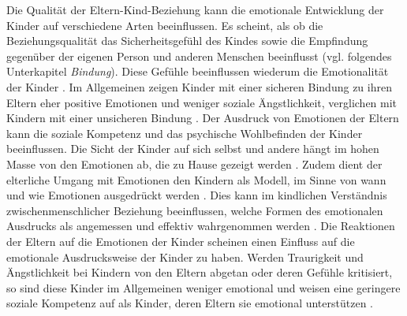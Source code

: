Die Qualität der Eltern-Kind-Beziehung kann die emotionale Entwicklung der Kinder auf verschiedene Arten beeinflussen. Es scheint, als ob die Beziehungsqualität das Sicherheitsgefühl des Kindes sowie die Empfindung gegenüber der eigenen Person und anderen Menschen beeinflusst (vgl. folgendes Unterkapitel \textit{Bindung}). Diese Gefühle beeinflussen wiederum die Emotionalität der Kinder \cite[S.~561]{Siegler2008}. Im Allgemeinen zeigen Kinder mit einer sicheren Bindung zu ihren Eltern eher positive Emotionen und weniger soziale Ängstlichkeit, verglichen mit Kindern mit einer unsicheren Bindung \cite{Bohlin2000}. Der Ausdruck von Emotionen der Eltern kann die soziale Kompetenz und das psychische Wohlbefinden der Kinder beeinflussen. Die Sicht der Kinder auf sich selbst und andere hängt im hohen Masse von den Emotionen ab, die zu Hause gezeigt werden \cite{Dunsmore1997}. Zudem dient der elterliche Umgang mit Emotionen den Kindern als Modell, im Sinne von wann und wie Emotionen ausgedrückt werden \cite{Denham1994}. Dies kann im kindlichen Verständnis zwischenmenschlicher Beziehung beeinflussen, welche Formen des emotionalen Ausdrucks als angemessen und effektiv wahrgenommen werden \cite{Halberstadt1995}. Die Reaktionen der Eltern auf die Emotionen der Kinder scheinen einen Einfluss auf die emotionale Ausdrucksweise der Kinder zu haben. Werden Traurigkeit und Ängstlichkeit bei Kindern von den Eltern abgetan oder deren Gefühle kritisiert, so sind diese Kinder im Allgemeinen weniger emotional und weisen eine geringere soziale Kompetenz auf als Kinder, deren Eltern sie emotional unterstützen \nohyphens{\cite{Eisenberg1998, McDowell2000}}. 


